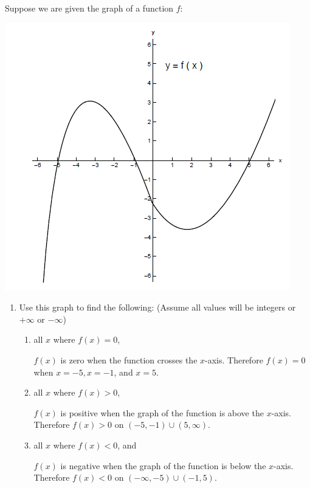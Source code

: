 \documentclass[nooutcomes]{ximera}
\begin{document}
\begin{problem}
  Suppose we are given the graph of a function $f$:
  \begin{image}
    \includegraphics[scale=.7]{Figure1.png}
  \end{image}
  \begin{enumerate}
    \item
      Use this graph to find the following:  (Assume all values will be integers or $+\infty$ or $-\infty$)
      \begin{enumerate}
        \item 
          all $x$ where $f(x) = 0$,
          \begin{freeResponse}
            $f(x)$ is zero when the function crosses the $x$-axis.
            Therefore $f(x) = 0$ when $x = -5, x=-1$, and $x = 5$.
          \end{freeResponse}

        \item 
          all $x$ where $f(x) > 0$, 
          \begin{freeResponse}
            $f(x)$ is positive when the graph of the function is above the $x$-axis.
            Therefore $f(x) > 0$ on $(-5,-1) \cup (5,\infty)$. 
          \end{freeResponse}

        \item
          all $x$ where $f(x) < 0$, and
          \begin{freeResponse}
            $f(x)$ is negative when the graph of the function is below the $x$-axis.
            Therefore $f(x) < 0$ on $(-\infty ,-5) \cup (-1,5)$.
          \end{freeResponse}


\end{enumerate}
\end{enumerate}
\end{problem}
\end{document}
